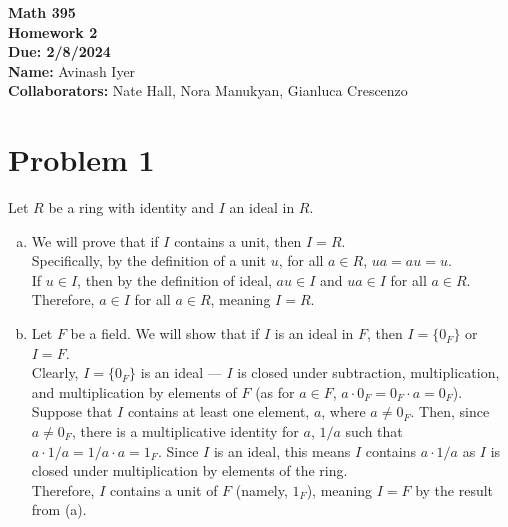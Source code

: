 \documentclass[10pt]{extarticle}
\title{}
\author{}
\date{}
\begin{document}
  \begin{center}
    {\bf \Large Math 395 \\[0.1in]Homework 2 \\[0.1in]
    Due: 2/8/2024}\\[.25in]
    {\bf Name:} {Avinash Iyer}\\[0.15in]
    {\bf Collaborators:} {Nate Hall, Nora Manukyan, Gianluca Crescenzo} \\
  \end{center}
  \section{Problem 1}%
  Let $R$ be a ring with identity and $I$ an ideal in $R$.
  \begin{enumerate}[(a)]
    \item We will prove that if $I$ contains a unit, then $I = R$.\\

      Specifically, by the definition of a unit $u$, for all $a\in R$, $ua = au = u$.\\

      If $u\in I$, then by the definition of ideal, $au\in I$ and $ua \in I$ for all $a\in R$. Therefore, $a\in I$ for all $a\in R$, meaning $I = R$.
    \item Let $F$ be a field. We will show that if $I$ is an ideal in $F$, then $I = \{0_F\}$ or $I = F$.\\

      Clearly, $I = \{0_F\}$ is an ideal --- $I$ is closed under subtraction, multiplication, and multiplication by elements of $F$ (as for $a\in F$, $a\cdot 0_F = 0_F \cdot a = 0_F$).\\

      Suppose that $I$ contains at least one element, $a$, where $a\neq 0_F$. Then, since $a \neq 0_F$, there is a multiplicative identity for $a$, $1/a$ such that $a\cdot 1/a = 1/a \cdot a = 1_F$. Since $I$ is an ideal, this means $I$ contains $a \cdot 1/a$ as $I$ is closed under multiplication by elements of the ring.\\

      Therefore, $I$ contains a unit of $F$ (namely, $1_F$), meaning $I = F$ by the result from (a).
  \end{enumerate}
\end{document}
